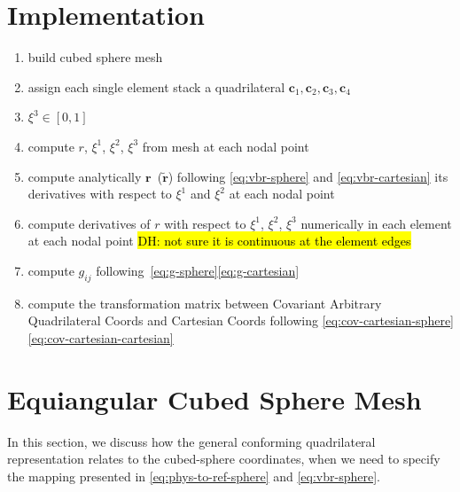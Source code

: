\documentclass{report}
\newcommand{\vb}{\mathbf}
\begin{document}
\section{Implementation}
\begin{enumerate}
    \item build cubed sphere mesh
    \item assign each single element stack a quadrilateral $\vb{c}_1, \vb{c}_2, \vb{c}_3, \vb{c}_4$
    \item  $\xi^3 \in [0, 1]$
    \item compute $r$, $\xi^1$, $\xi^2$, $\xi^3$ from mesh at each nodal point 
    \item compute analytically $\vb{r}$~($\widetilde{\vb{r}}$) following \eqref{eq:vbr-sphere} and \eqref{eq:vbr-cartesian} its derivatives with respect to $\xi^1$ and $\xi^2$ at each nodal point 
    \item compute derivatives of $r$ with respect to $\xi^1$, $\xi^2$, $\xi^3$ numerically in each element at each nodal point \hl{DH: not sure it is continuous at the element edges}
    \item compute $g_{ij}$ following~\eqref{eq:g-sphere}\eqref{eq:g-cartesian} 
    \item compute the transformation matrix between Covariant Arbitrary Quadrilateral Coords and Cartesian Coords following \eqref{eq:cov-cartesian-sphere}  \eqref{eq:cov-cartesian-cartesian} 
\end{enumerate}




\section{Equiangular Cubed Sphere Mesh}\label{s:cubed_sphere_transform}
\label{s:equiangle_cubed_sphere_transform}


In this section, we discuss how the general conforming quadrilateral representation relates to the cubed-sphere coordinates, when we need to specify the mapping presented in \eqref{eq:phys-to-ref-sphere} and \eqref{eq:vbr-sphere}.

\end{document}
